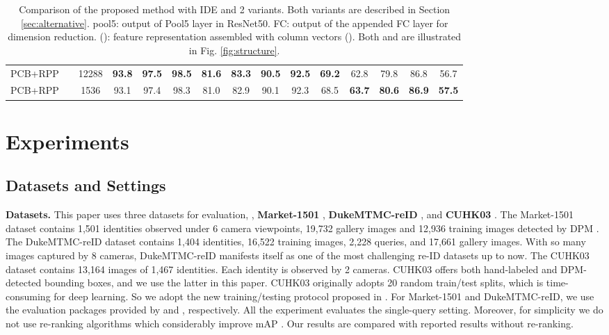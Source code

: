 \documentclass[10pt,twocolumn,letterpaper]{article}
\begin{document}
{{{\begin{table*}[]
\begin{center}
\begin{tabular}{l|c|c|c c c c|c c c c|c c c c}
PCB+RPP&  & 12288   &\textbf{93.8}&\textbf{97.5}&\textbf{98.5}&\textbf{81.6}    &\textbf{83.3}&\textbf{90.5}&\textbf{92.5}&\textbf{69.2}     &62.8&79.8&86.8&56.7\\
PCB+RPP & & 1536  &93.1&97.4&98.3&81.0   &82.9&90.1&92.3&68.5      &\textbf{63.7}&\textbf{80.6}&\textbf{86.9}&\textbf{57.5}\\

\hline 
\end{tabular}
\end{center}
\caption{Comparison of the proposed method with IDE and 2 variants. Both variants are described in Section \ref{sec:alternative}. pool5: output of Pool5 layer in ResNet50. FC: output of the appended FC layer for dimension reduction.   (): feature representation assembled with column vectors  (). Both  and  are illustrated in Fig. \ref{fig:structure}.}
\label{table:cmpbasl}
\end{table*}



\section{Experiments}\label{sec:experiment}
\subsection{Datasets and Settings}
\textbf{Datasets.} This paper uses three datasets for evaluation, \ie, \textbf{Market-1501} \cite{DBLP:conf/iccv/ZhengSTWWT15}, \textbf{DukeMTMC-reID} \cite{ristani2016MTMC,zheng2017unlabeled}, and \textbf{CUHK03} \cite{DBLP:conf/cvpr/LiZXW14}. The Market-1501 dataset contains 1,501 identities observed under 6 camera viewpoints, 19,732 gallery images and 12,936 training images detected by DPM \cite{felzenszwalb2008discriminatively}. The DukeMTMC-reID dataset contains 1,404 identities, 16,522 training images, 2,228 queries, and 17,661 gallery images. With so many images captured by 8 cameras, DukeMTMC-reID manifests itself as one of the most challenging re-ID datasets up to now. The CUHK03 dataset contains 13,164 images of 1,467 identities. Each identity is observed by 2 cameras. CUHK03 offers both hand-labeled and DPM-detected bounding boxes, and we use the latter in this paper. CUHK03 originally adopts 20 random train/test splits, which is time-consuming for deep learning. So we adopt the new training/testing protocol proposed in \cite{DBLP:conf/cvpr/ZhongZCL17}. For Market-1501 and DukeMTMC-reID, we use the evaluation packages provided by \cite{DBLP:conf/iccv/ZhengSTWWT15} and \cite{zheng2017unlabeled}, respectively.
All the experiment evaluates the single-query setting. 
Moreover, for simplicity we do not use re-ranking algorithms which considerably improve mAP \cite{DBLP:conf/cvpr/ZhongZCL17}. Our results are compared with reported results without re-ranking. 

}}}
\end{document}
